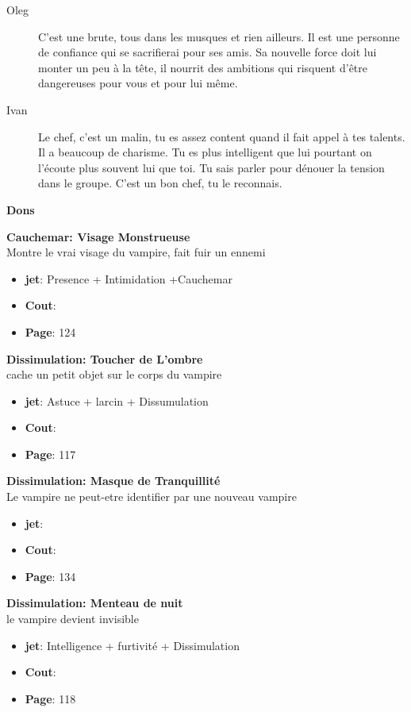 \documentclass[oneside,12pt]{book}
\newcommand\don[5]{
\textbf{#1} \\
#2
\begin{itemize}
\item{ \textbf{jet}: #3}
\item{ \textbf{Cout}: #4}
\item{ \textbf{Page}: #5}
\end{itemize}
\vspace{0.5cm}
}
\begin{document}
\begin{flushleft}
\begin{description}
\item[Oleg]{C'est une brute, tous dans les musques et rien ailleurs. Il est une personne de confiance qui se sacrifierai pour ses amis. Sa nouvelle force doit lui monter un peu à la tête, il nourrit des ambitions qui risquent d'être dangereuses pour vous et pour lui même. }
\item[Ivan]{Le chef, c'est un malin, tu es assez content quand il fait appel à tes talents. Il a beaucoup de charisme. Tu es plus intelligent que lui pourtant on l'écoute plus souvent lui que toi. Tu sais parler pour dénouer la tension dans le groupe. C'est un bon chef, tu le reconnais.}
\end{description}
 
\clearpage
\textbf{\large Dons}
\vspace{0.5cm}

\don{Cauchemar: Visage Monstrueuse}{Montre le vrai visage du vampire, fait fuir un ennemi}{Presence + Intimidation +Cauchemar}{}{124}
\don{Dissimulation: Toucher de L'ombre}{cache un petit objet sur le corps du vampire}{Astuce + larcin + Dissumulation}{}{117}
\don{Dissimulation: Masque de Tranquillité}{Le vampire ne peut-etre identifier par une nouveau vampire}{}{}{134 }
\don{Dissimulation: Menteau de nuit}{le vampire devient invisible}{Intelligence + furtivité + Dissimulation}{}{118}


\clearpage

\end{flushleft}
\end{document}
